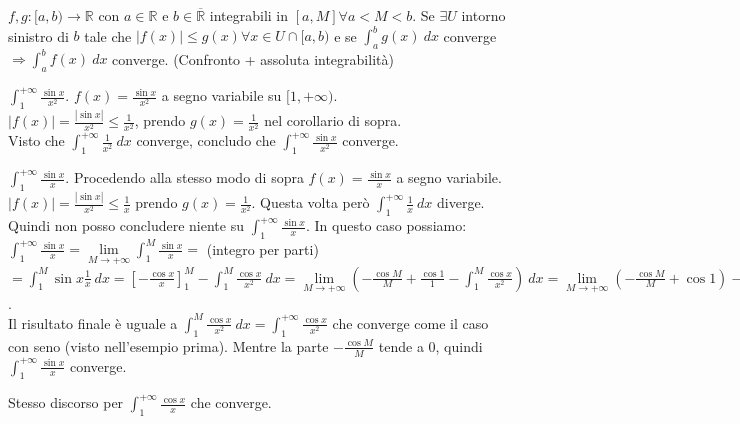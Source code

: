\begin{corollaries}
$f,g: [a,b)\to \mathbb{R}$ con $a \in \mathbb{R}$ e $b \in \mathbb{\overline{R}}$ integrabili in $[a,M] \forall a < M < b$. Se $\exists U$ intorno sinistro di $b$ tale che $|f(x)| \leq g(x) \forall x \in U \cap [a,b)$ e se $\int_a^b g(x) \:dx$ converge $\Longrightarrow \int_a^b f(x)\:dx$ converge. (Confronto + assoluta integrabilità)
\end{corollaries}

\begin{example}
$\int_1^{+\infty}\frac{\sin{x}}{x^2}$. $f(x) = \frac{\sin{x}}{x^2}$ a segno variabile su $[1,+\infty)$.\\
$|f(x)| = \frac{|\sin{x}|}{x^2} \leq \frac{1}{x^2}$, prendo $g(x) = \frac{1}{x^2}$ nel corollario di sopra.\\
Visto che $\int_1^{+\infty}\frac{1}{x^2}\:dx$ converge, concludo che $\int_1^{+\infty}\frac{\sin{x}}{x^2}$ converge.
\end{example}

\begin{example}
$\int_1^{+\infty}\frac{\sin{x}}{x}$. Procedendo alla stesso modo di sopra $f(x) = \frac{\sin{x}}{x}$ a segno variabile.\\
$|f(x)| = \frac{|\sin{x}|}{x^2} \leq \frac{1}{x}$ prendo $g(x) = \frac{1}{x^2}$. Questa volta però $\int_1^{+\infty}\frac{1}{x}\:dx$ diverge.\\
Quindi non posso concludere niente su $\int_1^{+\infty}\frac{\sin{x}}{x}$. In questo caso possiamo:
$\int_1^{+\infty}\frac{\sin{x}}{x} = \lim\limits_{M\to +\infty}\int_1^{M}\frac{\sin{x}}{x} = $ (integro per parti) $= \int_1^{M}\sin{x}\frac{1}{x}\:dx = [-\frac{\cos{x}}{x}]_1^M - \int_1^M \frac{\cos{x}}{x^2}\:dx =  \lim\limits_{M\to +\infty}(-\frac{\cos{M}}{M} + \frac{\cos{1}}{1} - \int_1^M \frac{\cos{x}}{x^2})\:dx =  \lim\limits_{M\to +\infty}(-\frac{\cos{M}}{M} + \cos{1}) - \lim\limits_{M\to +\infty}\int_1^M \frac{\cos{x}}{x^2}\:dx$.\\
Il risultato finale è uguale a $\int_1^M \frac{\cos{x}}{x^2}\:dx = \int_1^{+\infty}\frac{\cos{x}}{x^2}$ che converge come il caso con seno (visto nell'esempio prima). Mentre la parte $-\frac{\cos{M}}{M}$ tende a 0, quindi $\int_1^{+\infty}\frac{\sin{x}}{x}$ converge.
\end{example}

\begin{observation}
Stesso discorso per $\int_1^{+\infty}\frac{\cos{x}}{x}$ che converge.
\end{observation}

